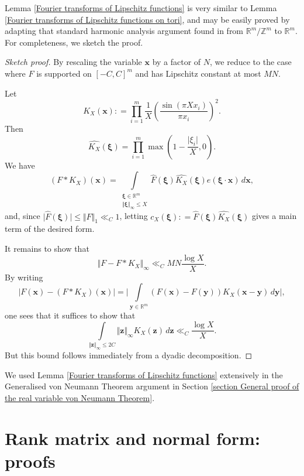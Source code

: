 \documentclass[12pt,a4paper,twoside,reqno]{amsart}
\numberwithin{equation}{section}
\begin{document}
Lemma \ref{Fourier transforms of Lipschitz functions} is very similar to Lemma \ref{Fourier transforms of Lipschitz functions on tori}, and may be easily proved by adapting that standard harmonic analysis argument found in \cite[Lemma A.9]{GrTa08} from  $\mathbb{R}^m/\mathbb{Z}^m$ to $\mathbb{R}^m$. For completeness, we sketch the proof. 

\begin{proof}[Sketch proof]
By rescaling the variable $\mathbf{x}$ by a factor of $N$, we reduce to the case where $F$ is supported on $[-C,C]^m$ and has Lipschitz constant at most $MN$. 

Let \[K_X(\mathbf{x}) : = \prod\limits_{i=1}^m \frac{1}{X} \left( \frac{\sin (\pi X x_i)}{\pi x_i} \right)^2.\] Then \[ \widehat{ K_X}(\boldsymbol{\xi}) = \prod\limits_{i=1}^m \max(1- \frac{\vert \xi_i\vert}{X},0).\] We have \[(F \ast K_X)(\mathbf{x}) = \int\limits_{ \substack{\boldsymbol{\xi} \in \mathbb{R}^m \\ \Vert \boldsymbol{\xi} \Vert_\infty \leqslant X} } \widehat{F}(\boldsymbol{\xi}) \widehat{ K_X}(\boldsymbol{\xi}) e(\boldsymbol{\xi} \cdot \mathbf{x}) \, d\mathbf{x},\] and, since $\vert \widehat{F}(\boldsymbol{\xi})\vert \leqslant \Vert F\Vert_1 \ll_C 1$, letting $c_X(\boldsymbol{\xi}) : = \widehat{F}(\boldsymbol{\xi}) \widehat{ K_X}(\boldsymbol{\xi})$ gives a main term of the desired form. 

It remains to show that \[\Vert F - F\ast K_X\Vert_\infty \ll_{C} MN \frac{\log X}{X}.\] By writing \[ \vert F(\mathbf{x}) - (F\ast K_X)(\mathbf{x})\vert = \Big\vert \int\limits_{\mathbf{y} \in \mathbb{R}^m} (F(\mathbf{x}) - F(\mathbf{y})) K_X(\mathbf{x} - \mathbf{y}) \, d\mathbf{y} \Big\vert,\] one sees that it suffices to show that \[ \int\limits_{\Vert \mathbf{z}\Vert_\infty \leqslant 2C} \Vert \mathbf{z} \Vert_\infty K_X(\mathbf{z}) \, d\mathbf{z} \ll_{C} \frac{\log X}{X}.\] But this bound follows immediately from a dyadic decomposition. 
\end{proof}

We used Lemma \ref{Fourier transforms of Lipschitz functions} extensively in the Generalised von Neumann Theorem argument in Section \ref{section General proof of the real variable von Neumann Theorem}.\\

\section{Rank matrix and normal form: proofs}
\label{section Rank matrix and normal form: Proofs}
\end{document}
